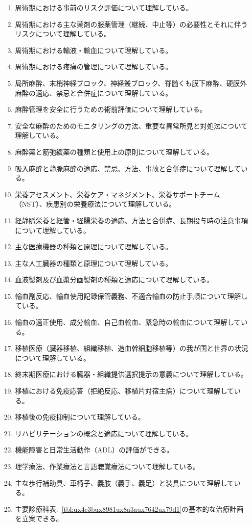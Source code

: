 \documentclass[
]{ltjsarticle}
\begin{document}
\begin{enumerate}
\item
  周術期における事前のリスク評価について理解している。
\item
  周術期における主な薬剤の服薬管理（継続、中止等）の必要性とそれに伴うリスクについて理解している。
\item
  周術期における輸液・輸血について理解している。
\item
  周術期における疼痛の管理について理解している。
\item
  局所麻酔、末梢神経ブロック、神経叢ブロック、脊髄くも膜下麻酔、硬膜外麻酔の適応、禁忌と合併症について理解している。
\item
  麻酔管理を安全に行うための術前評価について理解している。
\item
  安全な麻酔のためのモニタリングの方法、重要な異常所見と対処法について理解している。
\item
  麻酔薬と筋弛緩薬の種類と使用上の原則について理解している。
\item
  吸入麻酔と静脈麻酔の適応、禁忌、方法、事故と合併症について理解している。
\item
  栄養アセスメント、栄養ケア・マネジメント、栄養サポートチーム（NST）、疾患別の栄養療法について理解している。
\item
  経静脈栄養と経管・経腸栄養の適応、方法と合併症、長期投与時の注意事項について理解している。
\item
  主な医療機器の種類と原理について理解している。
\item
  主な人工臓器の種類と原理について理解している。
\item
  血液製剤及び血漿分画製剤の種類と適応について理解している。
\item
  輸血副反応、輸血使用記録保管義務、不適合輸血の防止手順について理解している。
\item
  輸血の適正使用、成分輸血、自己血輸血、緊急時の輸血について理解している。
\item
  移植医療（臓器移植、組織移植、造血幹細胞移植等）の我が国と世界の状況について理解している。
\item
  終末期医療における臓器・組織提供選択提示の意義について理解している。
\item
  移植における免疫応答（拒絶反応、移植片対宿主病）について理解している。
\item
  移植後の免疫抑制について理解している。
\item
  リハビリテーションの概念と適応について理解している。
\item
  機能障害と日常生活動作（ADL）の評価ができる。
\item
  理学療法、作業療法と言語聴覚療法について理解している。
\item
  主な歩行補助具、車椅子、義肢（義手、義足）と装具について理解している。
\item
  主要診療科表.~\ref{tbl:ux4e3bux8981ux8a3aux7642ux79d1}の基本的な治療計画を立案できる。
\end{enumerate}
\end{document}
